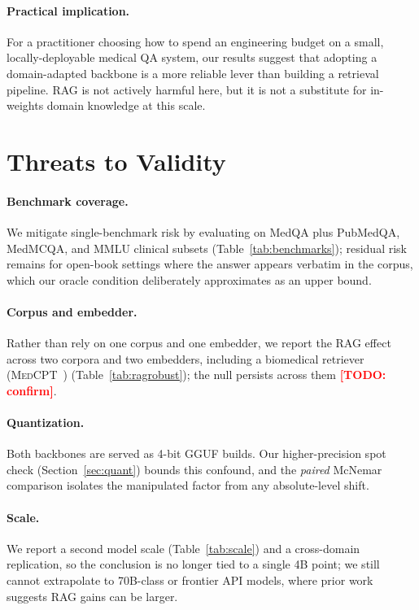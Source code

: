 \documentclass[11pt,a4paper]{article}
\newcommand{\TODO}[1]{\textcolor{red}{\textbf{[TODO: #1]}}}
\begin{document}
\paragraph{Practical implication.}
For a practitioner choosing how to spend an engineering budget on a
small, locally-deployable medical QA system, our results suggest that
adopting a domain-adapted backbone is a more reliable lever than
building a retrieval pipeline. RAG is not actively harmful here, but
it is not a substitute for in-weights domain knowledge at this scale.

\section{Threats to Validity}

\paragraph{Benchmark coverage.} We mitigate single-benchmark risk by evaluating
on MedQA plus PubMedQA, MedMCQA, and MMLU clinical subsets
(Table~\ref{tab:benchmarks}); residual risk remains for open-book settings where
the answer appears verbatim in the corpus, which our oracle condition
deliberately approximates as an upper bound.

\paragraph{Corpus and embedder.} Rather than rely on one corpus and one embedder,
we report the RAG effect across two corpora and two embedders, including a
biomedical retriever (\textsc{MedCPT}~\cite{jin2023medcpt})
(Table~\ref{tab:ragrobust}); the null persists across them \TODO{confirm}.

\paragraph{Quantization.} Both backbones are served as 4-bit GGUF builds. Our
higher-precision spot check (Section~\ref{sec:quant}) bounds this confound, and
the \emph{paired} McNemar comparison isolates the manipulated factor from any
absolute-level shift.

\paragraph{Scale.} We report a second model scale (Table~\ref{tab:scale}) and a
cross-domain replication, so the conclusion is no longer tied to a single 4B
point; we still cannot extrapolate to 70B-class or frontier API models, where
prior work suggests RAG gains can be larger.
\end{document}

